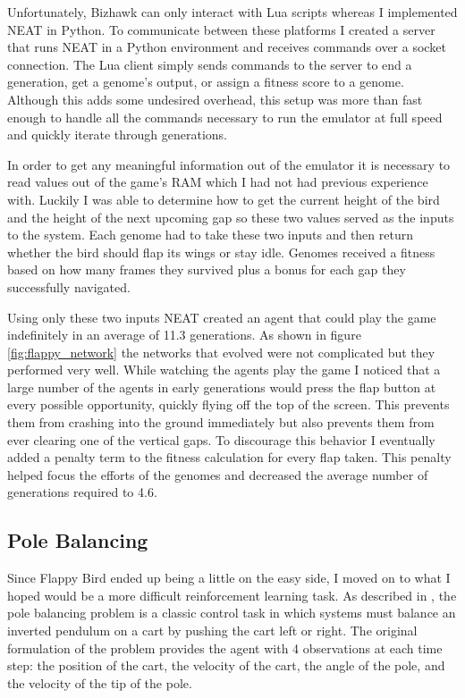 \documentclass[twocolumn,letterpaper]{article}
\begin{document}
Unfortunately, Bizhawk
can only interact with Lua scripts whereas I implemented NEAT in Python. To communicate between these
platforms I created a server that runs NEAT in a Python environment and receives commands over a socket
connection. The Lua client simply sends commands to the server to end a generation, get a genome's output,
or assign a fitness score to a genome. Although this adds some undesired overhead, this setup was more than fast enough to handle all the commands necessary to run the emulator at full speed and quickly iterate
through generations.

 In order to get any meaningful 
information out of the emulator it is necessary to read values out of the game's RAM which I had not had 
previous experience with. Luckily I was able to determine how to get the current height of the bird and
the height of the next upcoming gap so these two values served as the inputs to the system. Each genome
had to take these two inputs and then return whether the bird should flap its wings or stay idle. Genomes
received a fitness based on how many frames they survived plus a bonus for each gap they successfully 
navigated.

Using only these two inputs NEAT created an agent that could play the game indefinitely in an average of
11.3 generations. As shown in figure \ref{fig:flappy_network} the networks that evolved were not complicated
but they performed very well. While watching the agents play the game I noticed that a large number of the 
agents in early generations would press the flap button at every possible opportunity, quickly flying off the top of the
screen. This prevents them from crashing into the ground immediately but also prevents them from ever clearing
one of the vertical gaps. To discourage this behavior I eventually added a penalty term to the fitness
calculation for every flap taken. This penalty helped focus the efforts of the genomes and decreased the
average number of generations required to 4.6.  
 
\subsection{Pole Balancing}  \label{sec:pole}
Since Flappy Bird ended up being a little on the easy side, I moved on to what I hoped would be a more
difficult reinforcement learning task. As described in \cite{cartpole}, the pole balancing problem is a classic control task
in which systems must balance an inverted pendulum on a cart by pushing the cart left or right. The original
formulation of the problem provides the agent with 4 observations at each time step: the position of the
cart, the velocity of the cart, the angle of the pole, and the velocity of the tip of the pole. 
\end{document}
